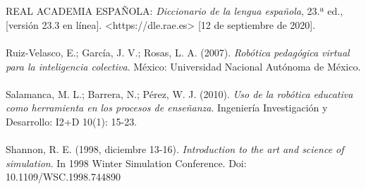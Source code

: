 \documentclass{report}
\begin{document}
\\
\\
REAL ACADEMIA ESPAÑOLA: \textit{Diccionario de la lengua española}, 23.ª ed., [versión 23.3 en línea]. <https://dle.rae.es> [12 de septiembre de 2020].
\\
\\
Ruiz-Velasco, E.; García, J. V.; Rosas, L. A. (2007). \textit{Robótica pedagógica virtual para la inteligencia colectiva}. México: Universidad Nacional Autónoma de México.
\\
\\
Salamanca, M. L.; Barrera, N.; Pérez, W. J. (2010). \textit{Uso de la robótica educativa como herramienta en los procesos de enseñanza}. Ingeniería Investigación y Desarrollo: I2+D 10(1): 15-23.
\\
\\
Shannon, R. E. (1998, diciembre 13-16). \textit{Introduction to the art and science of simulation}. In 1998 Winter Simulation Conference. Doi: 10.1109/WSC.1998.744890
\end{document}
